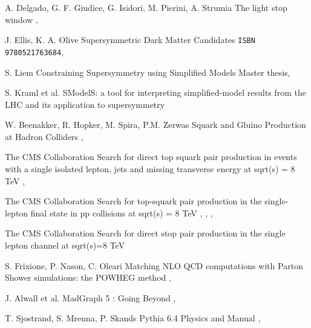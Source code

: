 {A. Delgado, G. F. Giudice, G. Isidori, M. Pierini, A. Strumia}
{The light stop window}
{, }

{J. Ellis, K. A. Olive}
{Supersymmetric Dark Matter Candidates}
{\texttt{ISBN 9780521763684}, }

{S. Liem}
{Constraining Supersymmetry using Simplified Models}
{Master thesis, }

{S. Kraml et al.}
{SModelS: a tool for interpreting simplified-model results from the LHC and its application to supersymmetry}
{ }

{W. Beenakker, R. Hopker, M. Spira, P.M. Zerwas}
{Squark and Gluino Production at Hadron Colliders}
{, }


{The CMS Collaboration}
{Search for direct top squark pair production in events with a single isolated lepton, jets and missing transverse energy at sqrt(s) = 8 TeV}
{, }

{The CMS Collaboration}
{Search for top-squark pair production in the single-lepton final state in pp collisions at sqrt(s) = 8 TeV}
{, , , }

{The CMS Collaboration}
{Search for direct stop pair production in the single lepton channel at sqrt(s)=8 TeV}
{}


{S. Frixione, P. Nason, C. Oleari}
{Matching NLO QCD computations with Parton Shower simulations: the POWHEG method}
{, }

{J. Alwall et al.}
{MadGraph 5 : Going Beyond}
{, }

{T. Sjostrand, S. Mrenna, P. Skands}
{Pythia 6.4 Physics and Manual}
{, }

